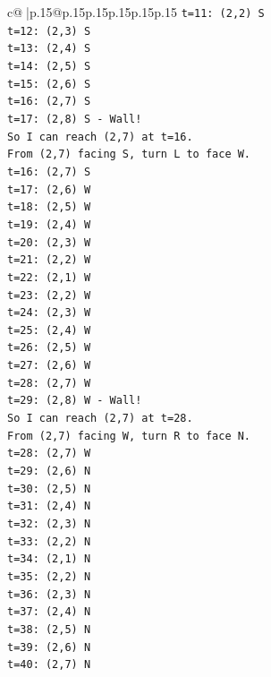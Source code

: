 \documentclass{article}
\begin{document}
{\begin{supertabular}{c@{$\;$}|p{.15\linewidth}@{}p{.15\linewidth}p{.15\linewidth}p{.15\linewidth}p{.15\linewidth}p{.15\linewidth}}
{{{\texttt{t=11: (2,2) S} \\
\texttt{t=12: (2,3) S} \\
\texttt{t=13: (2,4) S} \\
\texttt{t=14: (2,5) S} \\
\texttt{t=15: (2,6) S} \\
\texttt{t=16: (2,7) S} \\
\texttt{t=17: (2,8) S {-} Wall!} \\
\texttt{So I can reach (2,7) at t=16.} \\
\texttt{From (2,7) facing S, turn L to face W.} \\
\texttt{t=16: (2,7) S} \\
\texttt{t=17: (2,6) W} \\
\texttt{t=18: (2,5) W} \\
\texttt{t=19: (2,4) W} \\
\texttt{t=20: (2,3) W} \\
\texttt{t=21: (2,2) W} \\
\texttt{t=22: (2,1) W} \\
\texttt{t=23: (2,2) W} \\
\texttt{t=24: (2,3) W} \\
\texttt{t=25: (2,4) W} \\
\texttt{t=26: (2,5) W} \\
\texttt{t=27: (2,6) W} \\
\texttt{t=28: (2,7) W} \\
\texttt{t=29: (2,8) W {-} Wall!} \\
\texttt{So I can reach (2,7) at t=28.} \\
\texttt{From (2,7) facing W, turn R to face N.} \\
\texttt{t=28: (2,7) W} \\
\texttt{t=29: (2,6) N} \\
\texttt{t=30: (2,5) N} \\
\texttt{t=31: (2,4) N} \\
\texttt{t=32: (2,3) N} \\
\texttt{t=33: (2,2) N} \\
\texttt{t=34: (2,1) N} \\
\texttt{t=35: (2,2) N} \\
\texttt{t=36: (2,3) N} \\
\texttt{t=37: (2,4) N} \\
\texttt{t=38: (2,5) N} \\
\texttt{t=39: (2,6) N} \\
\texttt{t=40: (2,7) N} \\
}}}
\end{supertabular}}
\end{document}
